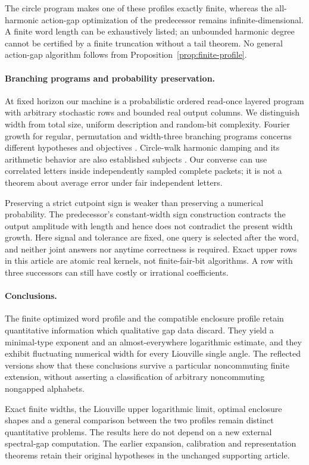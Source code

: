 The circle program makes one of these profiles exactly finite, whereas the all-harmonic action-gap optimization of the predecessor remains infinite-dimensional. A finite word length can be exhaustively listed; an unbounded harmonic degree cannot be certified by a finite truncation without a tail theorem. No general action-gap algorithm follows from Proposition~\ref{prop:finite-profile}.

\paragraph{Branching programs and probability preservation.}
At fixed horizon our machine is a probabilistic ordered read-once layered program with arbitrary stochastic rows and bounded real output columns. We distinguish width from total size, uniform description and random-bit complexity. Fourier growth for regular, permutation and width-three branching programs concerns different hypotheses and objectives \cite{RSV,SVW,LPV}. Circle-walk harmonic damping and its arithmetic behavior are also established subjects \cite{BB}. Our converse can use correlated letters inside independently sampled complete packets; it is not a theorem about average error under fair independent letters.

Preserving a strict cutpoint sign is weaker than preserving a numerical probability. The predecessor's constant-width sign construction contracts the output amplitude with length and hence does not contradict the present width growth. Here signal and tolerance are fixed, one query is selected after the word, and neither joint answers nor anytime correctness is required. Exact upper rows in this article are atomic real kernels, not finite-fair-bit algorithms. A row with three successors can still have costly or irrational coefficients.

\paragraph{Conclusions.}
The finite optimized word profile and the compatible enclosure profile retain quantitative information which qualitative gap data discard. They yield a minimal-type exponent and an almost-everywhere logarithmic estimate, and they exhibit fluctuating numerical width for every Liouville single angle. The reflected versions show that these conclusions survive a particular noncommuting finite extension, without asserting a classification of arbitrary noncommuting nongapped alphabets.

Exact finite widths, the Liouville upper logarithmic limit, optimal enclosure shapes and a general comparison between the two profiles remain distinct quantitative problems. The results here do not depend on a new external spectral-gap computation. The earlier expansion, calibration and representation theorems retain their original hypotheses in the unchanged supporting article.
